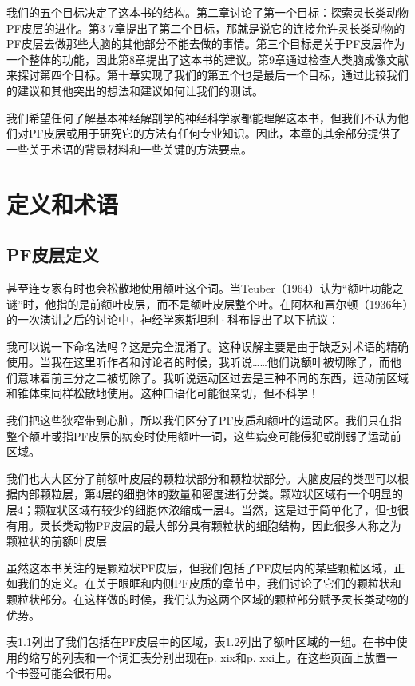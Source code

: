\par
我们的五个目标决定了这本书的结构。第二章讨论了第一个目标：探索灵长类动物PF皮层的进化。第3-7章提出了第二个目标，那就是说它的连接允许灵长类动物的PF皮层去做那些大脑的其他部分不能去做的事情。第三个目标是关于PF皮层作为一个整体的功能，因此第8章提出了这本书的建议。第9章通过检查人类脑成像文献来探讨第四个目标。第十章实现了我们的第五个也是最后一个目标，通过比较我们的建议和其他突出的想法和建议如何让我们的测试。
\par
我们希望任何了解基本神经解剖学的神经科学家都能理解这本书，但我们不认为他们对PF皮层或用于研究它的方法有任何专业知识。因此，本章的其余部分提供了一些关于术语的背景材料和一些关键的方法要点。



\section{定义和术语}
\subsection{PF皮层定义}
甚至连专家有时也会松散地使用额叶这个词。当Teuber（1964）认为“额叶功能之谜”时，他指的是前额叶皮层，而不是额叶皮层整个叶。在阿林和富尔顿（1936年）的一次演讲之后的讨论中，神经学家斯坦利·科布提出了以下抗议：
\par
我可以说一下命名法吗？这是完全混淆了。这种误解主要是由于缺乏对术语的精确使用。当我在这里听作者和讨论者的时候，我听说……他们说额叶被切除了，而他们意味着前三分之二被切除了。我听说运动区过去是三种不同的东西，运动前区域和锥体束同样松散地使用。这种口语化可能很亲切，但不科学！
\par
我们把这些狭窄带到心脏，所以我们区分了PF皮质和额叶的运动区。我们只在指整个额叶或指PF皮层的病变时使用额叶一词，这些病变可能侵犯或削弱了运动前区域。
\par
我们也大大区分了前额叶皮层的颗粒状部分和颗粒状部分。大脑皮层的类型可以根据内部颗粒层，第4层的细胞体的数量和密度进行分类。颗粒状区域有一个明显的层4；颗粒状区域有较少的细胞体浓缩成一层4。当然，这是过于简单化了，但也很有用。灵长类动物PF皮层的最大部分具有颗粒状的细胞结构，因此很多人称之为颗粒状的前额叶皮层 
\par
虽然这本书关注的是颗粒状PF皮层，但我们包括了PF皮层内的某些颗粒区域，正如我们的定义。在关于眼眶和内侧PF皮质的章节中，我们讨论了它们的颗粒状和颗粒状部分。在这样做的时候，我们认为这两个区域的颗粒部分赋予灵长类动物的优势。
\par
表1.1列出了我们包括在PF皮层中的区域，表1.2列出了额叶区域的一组。在书中使用的缩写的列表和一个词汇表分别出现在p. xix和p. xxi上。在这些页面上放置一个书签可能会很有用。
